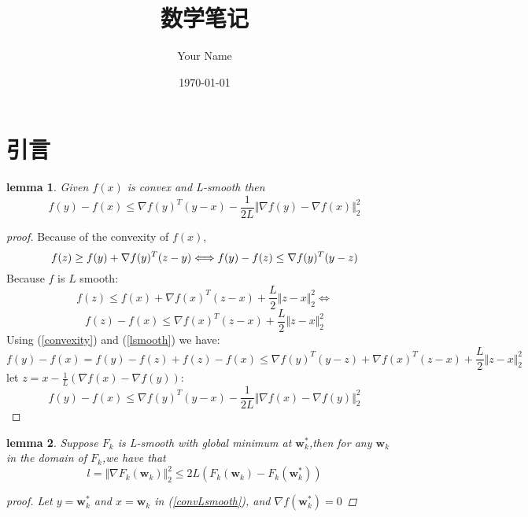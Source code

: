 \documentclass{article}
\title{数学笔记}
\author{Your Name}
\date{\today}
\newtheorem{lemma}{lemma}
\begin{document}
	\maketitle
	
	\section{引言}
	\begin{lemma}
		Given $f(x)$ is convex and L-smooth then
		\begin{equation}
		f(y)-f(x) \leq \nabla f(y)^T(y-x) - \frac{1}{2L}\Vert\nabla f(y)-\nabla f(x)\Vert^2_2\label{convLsmooth}
		\end{equation}
	\end{lemma}
	
	\begin{proof}[proof]
		Because of the convexity of $f(x)$,
			\begin{equation}
					f(z)\geq f(y)+\nabla f(y)^T(z-y)\\ 
					\Longleftrightarrow
					f(y)-f(z)\leq \nabla f(y)^T(y-z)\label{convexity}
			\end{equation}
		Because $f$ is $L$ smooth:
		\begin{equation*} 
			f(z)\leq f(x) + \nabla f(x)^T(z-x)+\frac{L}{2}\Vert z-x \Vert_2^2 \Longleftrightarrow
		\end{equation*}
		\begin{equation}
			f(z)-f(x)\leq \nabla f(x)^T(z-x)+\frac{L}{2}\Vert z - x \Vert_2^2\label{lsmooth}
		\end{equation}
		Using (\ref{convexity}) and (\ref{lsmooth}) we have:\\
		\begin{equation}
			f(y)-f(x) = f(y)-f(z) + f(z)-f(x)\leq \nabla f(y)^T(y-z) + \nabla f(x)^T(z-x) + \frac{L}{2}
			\Vert z - x \Vert_2^2
		\end{equation}
		let $z=x-\frac{1}{L}(\nabla f(x) - \nabla f(y))$:
		\begin{equation}
			f(y)-f(x) \leq \nabla f(y)^T(y-x) - \frac{1}{2L} \Vert \nabla f(x) - \nabla f(y) \Vert_2^2
		\end{equation}
	\end{proof}
	\begin{lemma}
		Suppose $F_k$ is L-smooth with global minimum at $\bm{w}^\ast_k$,then for any $\bm{w}_k$ in the domain of $F_k$,we have that
		\begin{equation}
		l = \Vert \nabla F_k(\bm{w}_k) \Vert_2^2 \leq 2L(F_k(\bm{{w}}_k) - F_k(\bm{w}_k^\ast))
		\end{equation}
		\begin{proof}[proof]
			Let $y=\bm{w}_k^\ast$ and $x = \bm{w}_k$ in (\ref{convLsmooth}), and $\nabla f(\bm{w}^\ast_k) = 0$
		\end{proof}
	\end{lemma}
\end{document}
